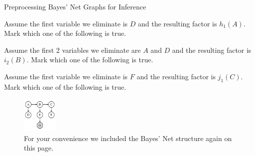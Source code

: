 \begin{problem}[]{Preprocessing Bayes' Net Graphs for Inference}
\begin{question}[2]
Assume the first variable we eliminate is $D$ and the resulting factor is $h_1(A)$. Mark which one of the following is true.
\begin{multicols}{3}
\begin{itemize}[label=, itemsep=12pt, topsep=12pt]
\TwoC
\end{itemize}
\end{multicols}
\end{question}

\begin{question}[2]
Assume the first 2 variables we eliminate are $A$ and $D$ and the resulting factor is $i_2(B)$. Mark which one of the following is true.
\begin{multicols}{3}
\begin{itemize}[label=, itemsep=12pt, topsep=12pt]
\TwoD
\end{itemize}
\end{multicols}
\end{question}

\begin{question}[2]
Assume the first variable we eliminate is $F$ and the resulting factor is $j_1(C)$. Mark which one of the following is true.
\begin{multicols}{3}
\begin{itemize}[label=, itemsep=12pt, topsep=12pt]
\TwoE
\end{itemize}
\end{multicols}
\end{question}

\begin{figure}[H]
\centering
    \includegraphics[width=0.15\textwidth]{figures/FA12-MT2-Elimination3V2.pdf}
\caption*{For your convenience we included the Bayes' Net structure
  again on this page.}
\end{figure}
\vspace{-0.2in}


\end{problem}
